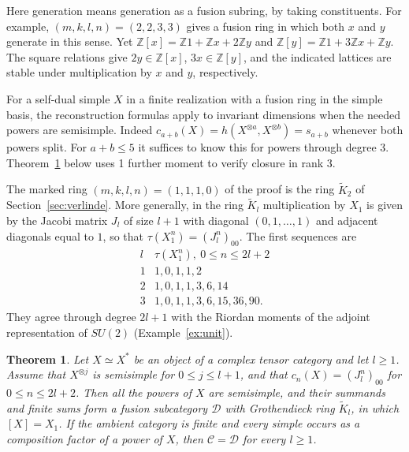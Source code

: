 \documentclass[11pt,reqno]{amsart}
\newtheorem{theorem}{Theorem}[section]
\theoremstyle{definition}
\newcommand{\C}{\mathcal C}
\newcommand{\ZZ}{\mathbb Z}
\begin{document}
Here generation means generation as a fusion subring, by taking constituents. For example, $(m,k,l,n)=(2,2,3,3)$ gives a fusion ring in which both $x$ and $y$ generate in this sense. Yet $\ZZ[x]=\ZZ1+\ZZ x+2\ZZ y$ and $\ZZ[y]=\ZZ1+3\ZZ x+\ZZ y$. The square relations give $2y\in\ZZ[x]$, $3x\in\ZZ[y]$, and the indicated lattices are stable under multiplication by $x$ and $y$, respectively.

For a self-dual simple $X$ in a finite realization with a fusion ring in the simple basis, the reconstruction formulas apply to invariant dimensions when the needed powers are semisimple. Indeed $c_{a+b}(X)=h(X^{\otimes a},X^{\otimes b})=s_{a+b}$ whenever both powers split. For $a+b\le5$ it suffices to know this for powers through degree 3. Theorem~\ref{thm:small-recognition} below uses 1 further moment to verify closure in rank 3.

The marked ring $(m,k,l,n)=(1,1,1,0)$ of the proof is the ring $\widetilde K_2$ of Section~\ref{sec:verlinde}. More generally, in the ring $\widetilde K_l$ multiplication by $X_1$ is given by the Jacobi matrix $J_l$ of size $l+1$ with diagonal $(0,1,\ldots,1)$ and adjacent diagonals equal to $1$, so that $\tau(X_1^n)=(J_l^n)_{00}$. The first sequences are
\[
\begin{array}{c|l}
 l & \tau(X_1^n),\ 0\leq n\leq 2l+2\\ \hline
 1 &1,0,1,1,2\\
 2 &1,0,1,1,3,6,14\\
 3 &1,0,1,1,3,6,15,36,90 .
\end{array}
\]
They agree through degree $2l+1$ with the Riordan moments of the adjoint representation of $SU(2)$ (Example~\ref{ex:unit}).

\begin{theorem}\label{thm:small-recognition}
Let $X\simeq X^*$ be an object of a complex tensor category and let $l\geq1$. Assume that $X^{\otimes j}$ is semisimple for $0\leq j\leq l+1$, and that $c_n(X)=(J_l^n)_{00}$ for $0\leq n\leq2l+2$. Then all the powers of $X$ are semisimple, and their summands and finite sums form a fusion subcategory $\mathcal D$ with Grothendieck ring $\widetilde K_l$, in which $[X]=X_1$. If the ambient category is finite and every simple occurs as a composition factor of a power of $X$, then $\C=\mathcal D$ for every $l\ge1$.
\end{theorem}
\end{document}
